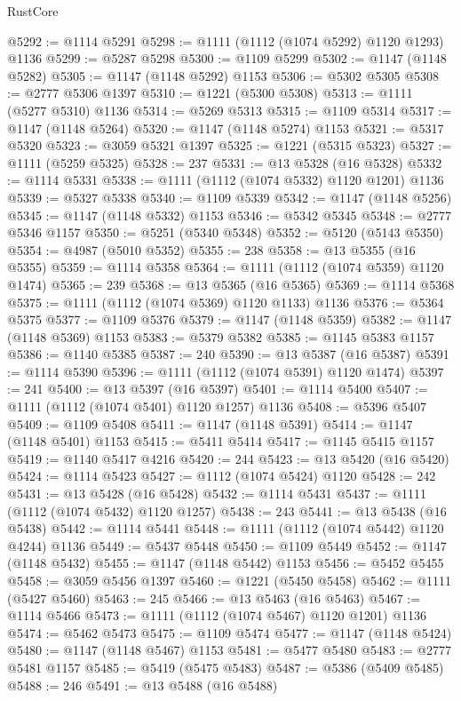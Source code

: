 \begin{lexlean}{RustCore}
\begin{coremodule}
@5292 := @1114 @5291
@5298 := @1111 (@1112 (@1074 @5292) @1120 @1293) @1136
@5299 := @5287 @5298
@5300 := @1109 @5299
@5302 := @1147 (@1148 @5282)
@5305 := @1147 (@1148 @5292) @1153
@5306 := @5302 @5305
@5308 := @2777 @5306 @1397
@5310 := @1221 (@5300 @5308)
@5313 := @1111 (@5277 @5310) @1136
@5314 := @5269 @5313
@5315 := @1109 @5314
@5317 := @1147 (@1148 @5264)
@5320 := @1147 (@1148 @5274) @1153
@5321 := @5317 @5320
@5323 := @3059 @5321 @1397
@5325 := @1221 (@5315 @5323)
@5327 := @1111 (@5259 @5325)
@5328 := 237
@5331 := @13 @5328 (@16 @5328)
@5332 := @1114 @5331
@5338 := @1111 (@1112 (@1074 @5332) @1120 @1201) @1136
@5339 := @5327 @5338
@5340 := @1109 @5339
@5342 := @1147 (@1148 @5256)
@5345 := @1147 (@1148 @5332) @1153
@5346 := @5342 @5345
@5348 := @2777 @5346 @1157
@5350 := @5251 (@5340 @5348)
@5352 := @5120 (@5143 @5350)
@5354 := @4987 (@5010 @5352)
@5355 := 238
@5358 := @13 @5355 (@16 @5355)
@5359 := @1114 @5358
@5364 := @1111 (@1112 (@1074 @5359) @1120 @1474)
@5365 := 239
@5368 := @13 @5365 (@16 @5365)
@5369 := @1114 @5368
@5375 := @1111 (@1112 (@1074 @5369) @1120 @1133) @1136
@5376 := @5364 @5375
@5377 := @1109 @5376
@5379 := @1147 (@1148 @5359)
@5382 := @1147 (@1148 @5369) @1153
@5383 := @5379 @5382
@5385 := @1145 @5383 @1157
@5386 := @1140 @5385
@5387 := 240
@5390 := @13 @5387 (@16 @5387)
@5391 := @1114 @5390
@5396 := @1111 (@1112 (@1074 @5391) @1120 @1474)
@5397 := 241
@5400 := @13 @5397 (@16 @5397)
@5401 := @1114 @5400
@5407 := @1111 (@1112 (@1074 @5401) @1120 @1257) @1136
@5408 := @5396 @5407
@5409 := @1109 @5408
@5411 := @1147 (@1148 @5391)
@5414 := @1147 (@1148 @5401) @1153
@5415 := @5411 @5414
@5417 := @1145 @5415 @1157
@5419 := @1140 @5417 @4216
@5420 := 244
@5423 := @13 @5420 (@16 @5420)
@5424 := @1114 @5423
@5427 := @1112 (@1074 @5424) @1120
@5428 := 242
@5431 := @13 @5428 (@16 @5428)
@5432 := @1114 @5431
@5437 := @1111 (@1112 (@1074 @5432) @1120 @1257)
@5438 := 243
@5441 := @13 @5438 (@16 @5438)
@5442 := @1114 @5441
@5448 := @1111 (@1112 (@1074 @5442) @1120 @4244) @1136
@5449 := @5437 @5448
@5450 := @1109 @5449
@5452 := @1147 (@1148 @5432)
@5455 := @1147 (@1148 @5442) @1153
@5456 := @5452 @5455
@5458 := @3059 @5456 @1397
@5460 := @1221 (@5450 @5458)
@5462 := @1111 (@5427 @5460)
@5463 := 245
@5466 := @13 @5463 (@16 @5463)
@5467 := @1114 @5466
@5473 := @1111 (@1112 (@1074 @5467) @1120 @1201) @1136
@5474 := @5462 @5473
@5475 := @1109 @5474
@5477 := @1147 (@1148 @5424)
@5480 := @1147 (@1148 @5467) @1153
@5481 := @5477 @5480
@5483 := @2777 @5481 @1157
@5485 := @5419 (@5475 @5483)
@5487 := @5386 (@5409 @5485)
@5488 := 246
@5491 := @13 @5488 (@16 @5488)

\end{coremodule}
\end{lexlean}
